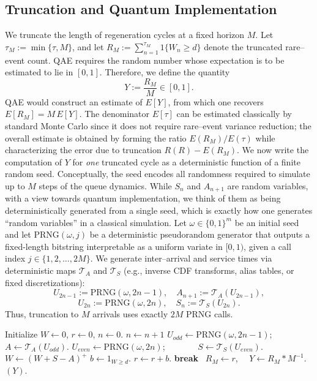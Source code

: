 \documentclass[11pt]{article}
\begin{document}
\subsection{Truncation and Quantum Implementation}
\label{sec:trunc-norm-quantum}

We truncate the length of regeneration cycles at a fixed horizon $M$.
Let $\tau_M:=\min\{\tau,M\}$, and let $R_M:=\sum_{n=1}^{\tau_M}{1}\{W_n\ge d\}$
denote the truncated rare--event count.
QAE requires the random number whose expectation is to be estimated to lie in $[0,1].$ Therefore, we define the quantity
\[
Y := \frac{R_M}{M} \in [0,1].
\]
QAE would construct an estimate of $E[Y]$, from which one
recovers $E[R_M]=M\,E[Y]$.
The denominator $E[\tau]$ can
be estimated classically by standard Monte Carlo since it does not require rare--event
variance reduction;
the overall estimate is obtained by forming the ratio $E(R_M)/E(\tau)$ while characterizing the error due to truncation $R(R)-E(R_M)$.
We now write the computation of $Y$ for \emph{one} truncated cycle as a
deterministic function of a finite random seed.
Conceptually, the seed encodes
all randomness required to simulate up to $M$ steps of the queue dynamics.
While $S_n$ and $A_{n+1}$ are random variables, with a view towards quantum implementation, we think of them as being deterministically generated from a single seed, which is exactly how one generates ``random variables'' in a classical simulation.
Let $\omega\in\{0,1\}^m$ be an initial seed and let $\mathrm{PRNG}(\omega,j)$ be a
deterministic pseudorandom generator that outputs a fixed-length bitstring
interpretable as a uniform variate in $[0,1)$,
given a call index $j\in\{1,2,\dots,2M\}$.
We generate inter--arrival and service
times via deterministic maps $\mathcal{T}_A$ and $\mathcal{T}_S$ (e.g., inverse
CDF transforms, alias tables, or fixed discretizations):
\[
U_{2n-1} := \mathrm{PRNG}(\omega,2n-1),\quad A_{n+1} := \mathcal{T}_A(U_{2n-1}),
\]
\[
U_{2n} := \mathrm{PRNG}(\omega,2n),\quad S_n := \mathcal{T}_S(U_{2n}).
\]
Thus, truncation to $M$ arrivals uses exactly $2M$ PRNG calls.
\begin{algorithm}
\caption{\textsc{EvaluateTruncatedCycle}$(\omega)$ for $GI/GI/1$}
\label{alg:seed-cycle-lindley}
\begin{algorithmic}[1]
\State Initialize $W \gets 0$, $r \gets 0$, $n \gets 0$.
  \State $n \gets n+1$
  \State $U_{odd} \gets \mathrm{PRNG}(\omega,2n-1)$;
\ \ $A \gets \mathcal{T}_A(U_{odd})$.
  \State $U_{even} \gets \mathrm{PRNG}(\omega,2n)$; \ \ \ \ \ \ \ $S \gets \mathcal{T}_S(U_{even})$.
\State $W \gets (W + S - A)^+$ 
  \State $b \gets {1}_{W \ge d}$.
\State $r \gets r + b.$
    \State \textbf{break} 
  \EndIf
\EndWhile
\State \ $R_M \gets r$, \ \ $Y \gets R_M*M^{-1}$.
\State \Return $(Y)$.
\end{algorithmic}
\end{algorithm}
\end{document}
